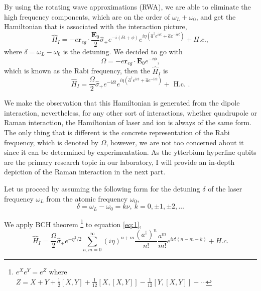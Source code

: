 By using the rotating wave approximations (RWA), we are able to eliminate the high frequency components, which are on the order of $\omega_L+\omega_0$, and get the Hamiltonian that is associated with the interaction picture,
\begin{equation}
    \hat{H}_I=-e \mathbf{r}_{e g} \cdot \frac{\mathbf{E}_0}{2} \hat{\sigma}_{+} e^{-i(\delta t+\phi)} e^{i \eta\left(\hat{a}^{\dagger} e^{i v t}+\hat{a} e^{-i v t}\right)}+H.c.,
\end{equation}
where $\delta = \omega_L-\omega_0$ is the detuning. We decided to go with
\begin{equation}
    \Omega=-e \mathbf{r}_{e g} \cdot \mathbf{E}_0 e^{-i \phi},
\end{equation}
which is known as the Rabi frequency, then the $\hat{H}_I$ is
\begin{equation}\label{eq:1}
    \hat{H}_I=\frac{\Omega}{2} \hat{\sigma}_{+} e^{-i \delta t} e^{i \eta\left(\hat{a}^{\dagger} e^{i v t}+\hat{a} e^{-i v t}\right)}+\text { H.c. }.
\end{equation}

We make the observation that this Hamiltonian is generated from the dipole interaction, nevertheless, for any other sort of interactions, whether quadrupole or Raman interaction, the Hamiltonian of laser and ion is always of the same form. The only thing that is different is the concrete representation of the Rabi frequency, which is denoted by $\Omega$, however, we are not too concerned about it since it can be determined by experimentation. As the ytterbium hyperfine qubits are the primary research topic in our laboratory, I will provide an in-depth depiction of the Raman interaction in the next part.

Let us proceed by assuming the following form for the detuning $\delta$ of the laser frequency $\omega_L$ from the atomic frequency $\omega_0$,
\begin{equation}
    \delta=\omega_L-\omega_0=k\nu, \ k=0,\pm1,\pm2,\dots
\end{equation}

We apply BCH theorem \footnote{$e^{X} e^{Y}=e^{Z}$ where $Z=X+Y+\frac{1}{2}[X, Y]+\frac{1}{12}[X,[X, Y]]-\frac{1}{12}[Y,[X, Y]]+\cdots$} to equation \eqref{eq:1},
\begin{equation}
    \label{2}
    \hat{H}_I=\frac{\Omega}{2} \hat{\sigma}_+ e^{-\eta^2/2}\sum_{n,m=0}^{\infty} (i\eta)^{n+m}\frac{(a^\dagger)^n}{n!}\frac{a^m}{m!}e^{i\nu t (n-m-k)} + H.c.
\end{equation}

